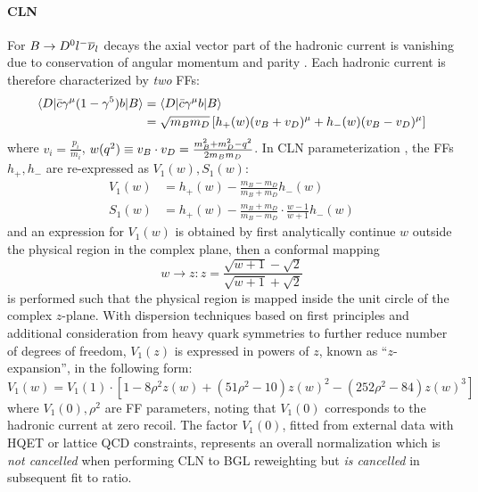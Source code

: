 \paragraph{CLN}
For $B \rightarrow {\ensuremath{{D}^0}}{\ensuremath{l^-}}{\ensuremath{{\overline{\nu}}_l}}$ decays the axial vector part of the hadronic
current is vanishing due to conservation of angular momentum and parity
\cite{Bernlochner_2022}.
Each hadronic current is therefore characterized by \emph{two} FFs:
\begin{align}
    \langle D\rvert \bar{c} \gamma^\mu(1 - \gamma^5) b \lvert B\rangle &=
    \langle D\rvert \bar{c} \gamma^\mu b \lvert B\rangle
    \nonumber \\
    &=
    \sqrt{m_B m_D} \left[
        h_+(w)(v_B + v_D)^\mu + h_-(w)(v_B - v_D)^\mu
    \right]
    \label{eqn:b-d-cln-param}
\end{align}
where $v_i = \frac{p_i}{m_i}$,
$w(q^2) \equiv v_B \cdot v_D = \frac{m^2_B + m^2_D - q^2}{2 m_B m_D}$.
In CLN parameterization \cite{Caprini_1998},
the FFs $h_+, h_-$ are re-expressed as $V_1(w), S_1(w)$:
\begin{align}
    V_1(w) &= h_+(w) - \frac{m_B - m_D}{m_B + m_D} h_-(w) \\
    S_1(w) &= h_+(w) - \frac{m_B + m_D}{m_B - m_D} \cdot \frac{w-1}{w+1} h_-(w)
\end{align}
and an expression for $V_1(w)$ is obtained by first analytically continue $w$
outside the physical region in the complex plane, then a conformal mapping
\begin{equation}
    w \rightarrow z: z =
    \frac{\sqrt{w+1} - \sqrt{2}}{\sqrt{w+1} + \sqrt{2}}
\end{equation}
is performed such that the physical region is mapped inside the unit circle of
the complex $z$-plane.
With dispersion techniques based on first principles and additional
consideration from heavy quark symmetries to further reduce number of degrees of
freedom,
$V_1(z)$ is expressed in powers of $z$, known as ``$z$-expansion'', in the
following form:
\begin{equation}
    V_1(w) = V_1(1) \cdot \left[
        1 - 8 \rho^2 z(w) + (51 \rho^2 - 10) z(w)^2 -
        (252 \rho^2 - 84) z(w)^3
    \right]
\end{equation}
where $V_1(0), \rho^2$ are FF parameters,
noting that $V_1(0)$ corresponds to the hadronic current at zero recoil.
The factor $V_1(0)$,
fitted from external data with HQET or lattice QCD constraints,
represents an overall normalization which is \emph{not cancelled} when
performing CLN to BGL reweighting but \emph{is cancelled} in subsequent fit to
\RD ratio.

